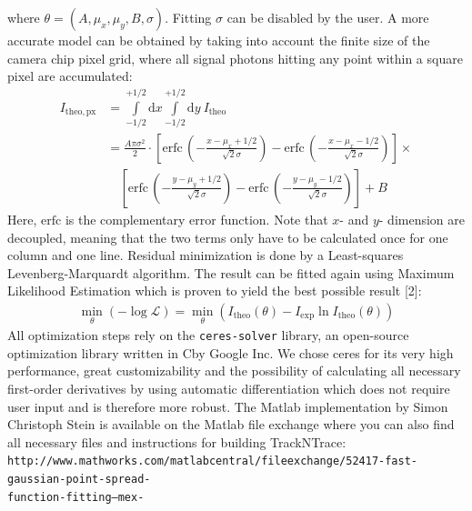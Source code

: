 \documentclass[11pt,onside]{report}
\newcommand{\D}[0]{\text{d}}
\numberwithin{equation}{chapter}
\def\CC{{C\nolinebreak[4]\hspace{-.05em}\raisebox{.4ex}{\tiny\bf ++}}}
\begin{document}
where $\theta = (A,\mu_x,\mu_y,B,\sigma)$. Fitting $\sigma$ can be disabled by the user. A more accurate model can be obtained by taking into account the finite size of the camera chip pixel grid, where all signal photons hitting any point within a square pixel are accumulated:
\begin{align*}
I_\mathrm{theo, px} &= \int\limits^{+1\slash 2}_{-1\slash 2} \D x \int\limits^{+1\slash 2}_{-1\slash 2} \D y\: I_\mathrm{theo} \\
&= \frac{A \pi \sigma^2}{2}\cdot \left[\mathrm{erfc}\,\left(-\frac{x-\mu_x+1\slash 2}{\sqrt{2} \sigma}\right) - \mathrm{erfc}\,\left(-\frac{x-\mu_x-1\slash 2}{\sqrt{2} \sigma}\right)\right] \times \\
&\quad \left[\mathrm{erfc}\,\left(-\frac{y-\mu_y+1\slash 2}{\sqrt{2} \sigma}\right) - \mathrm{erfc}\,\left(-\frac{y-\mu_y-1\slash 2}{\sqrt{2} \sigma}\right)\right] +B
\end{align*}
Here, $\mathrm{erfc}$ is the complementary error function. Note that $x$- and $y$- dimension are decoupled, meaning that the two terms only have to be calculated once for one column and one line. Residual minimization is done by a Least-squares Levenberg-Marquardt algorithm. The result can be fitted again using Maximum Likelihood Estimation which is proven to yield the best possible result [2]:
\begin{align*}
\min_\theta (-\log\mathcal{L}) = \min_\theta (I_\mathrm{theo}(\theta) - I_\mathrm{exp} \ln I_\mathrm{theo}(\theta))
\end{align*}
All optimization steps rely on the \texttt{ceres-solver} library, an open-source optimization library written in \CC by Google Inc. We chose ceres for its very high performance, great customizability and the possibility of calculating all necessary first-order derivatives by using automatic differentiation which does not require user input and is therefore more robust. The Matlab implementation by Simon Christoph Stein is available on the Matlab file exchange where you can also find all necessary files and instructions for building {TrackNTrace}:  \texttt{http://www.mathworks.com/matlabcentral/fileexchange/52417-fast-gaussian-point-spread-\\function-fitting--mex-}\\[10pt]
\end{document}
